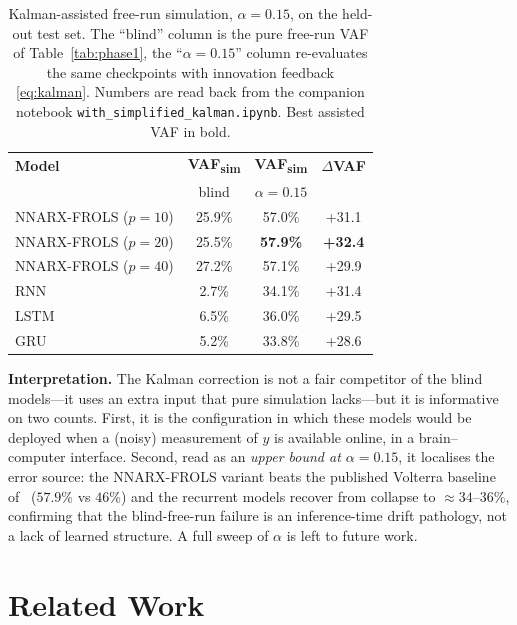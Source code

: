 \documentclass[10pt,twocolumn,letterpaper]{article}
\begin{document}
\begin{table}[t]
\centering
\caption{Kalman-assisted free-run simulation, $\alpha=0.15$, on the
held-out test set. The ``blind'' column is the pure free-run VAF of
Table~\ref{tab:phase1}, the ``$\alpha=0.15$'' column re-evaluates the same
checkpoints with innovation feedback \eqref{eq:kalman}. Numbers are read
back from the companion notebook \texttt{with\_simplified\_kalman.ipynb}.
Best assisted VAF in bold.}
\label{tab:kalman}
\setlength{\tabcolsep}{4pt}
\begin{tabular}{lccc}
\toprule
\textbf{Model}
& \textbf{VAF\textsubscript{sim}}
& \textbf{VAF\textsubscript{sim}}
& \textbf{$\Delta$VAF} \\
& blind & $\alpha=0.15$ & \\
\midrule
NNARX-FROLS ($p=10$) & 25.9\% & 57.0\% & +31.1 \\
NNARX-FROLS ($p=20$) & 25.5\% & \textbf{57.9\%} & \textbf{+32.4} \\
NNARX-FROLS ($p=40$) & 27.2\% & 57.1\% & +29.9 \\
RNN                  &  2.7\% & 34.1\% & +31.4 \\
LSTM                 &  6.5\% & 36.0\% & +29.5 \\
GRU                  &  5.2\% & 33.8\% & +28.6 \\
\bottomrule
\end{tabular}
\end{table}

\noindent\textbf{Interpretation.}
The Kalman correction is not a fair competitor of the blind models---it
uses an extra input that pure simulation lacks---but it is informative on
two counts. First, it is the configuration in which these models would be
deployed when a (noisy) measurement of $y$ is available online, \eg in a
brain--computer interface. Second, read as an \emph{upper bound at
$\alpha=0.15$}, it localises the error source: the NNARX-FROLS variant
beats the published Volterra baseline of~\cite{Vlaar2018} ($57.9\%$ vs
$46\%$) and the recurrent models recover from collapse to
$\approx 34$--$36\%$, confirming that the blind-free-run failure is an
inference-time drift pathology, not a lack of learned structure. A full
sweep of $\alpha$ is left to future work.

\section{Related Work}\label{sec:rw}
\end{document}
